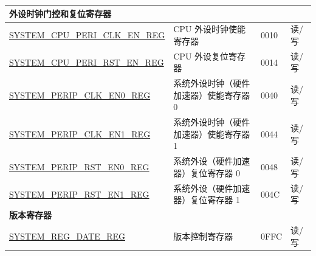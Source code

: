 \begin{longtable}{ | p{7cm} | p{6.5cm} | p{1.3cm} | p{1.5cm} | }
\multicolumn{4}{|l|}{\textbf{外设时钟门控和复位寄存器}} \\ \hline

\hyperref[regdesc:SYSTEMCPUPERICLKENREG]{SYSTEM\_CPU\_PERI\_CLK\_EN\_REG} & CPU 外设时钟使能寄存器 & \hexprefix{}0010 & 读/写 \\ \hline
\hyperref[regdesc:SYSTEMCPUPERIRSTENREG]{SYSTEM\_CPU\_PERI\_RST\_EN\_REG} & CPU 外设复位寄存器 & \hexprefix{}0014 & 读/写 \\ \hline
\hyperref[regdesc:SYSTEMPERIPCLKEN0REG]{SYSTEM\_PERIP\_CLK\_EN0\_REG} & 系统外设时钟（硬件加速器）使能寄存器 0 & \hexprefix{}0040 & 读/写 \\ \hline
\hyperref[regdesc:SYSTEMPERIPCLKEN1REG]{SYSTEM\_PERIP\_CLK\_EN1\_REG} & 系统外设时钟（硬件加速器）使能寄存器 1 & \hexprefix{}0044 & 读/写 \\ \hline
\hyperref[regdesc:SYSTEMPERIPRSTEN0REG]{SYSTEM\_PERIP\_RST\_EN0\_REG} & 系统外设（硬件加速器）复位寄存器 0 & \hexprefix{}0048 & 读/写 \\ \hline
\hyperref[regdesc:SYSTEMPERIPRSTEN1REG]{SYSTEM\_PERIP\_RST\_EN1\_REG} & 系统外设（硬件加速器）复位寄存器 1 & \hexprefix{}004C & 读/写 \\ \hline


\multicolumn{4}{|l|}{\textbf{版本寄存器}} \\ \hline
\hyperref[regdesc:SYSTEMREGDATEREG]{SYSTEM\_REG\_DATE\_REG} & 版本控制寄存器 & \hexprefix{}0FFC & 读/写 \\ \hline
\end{longtable}
